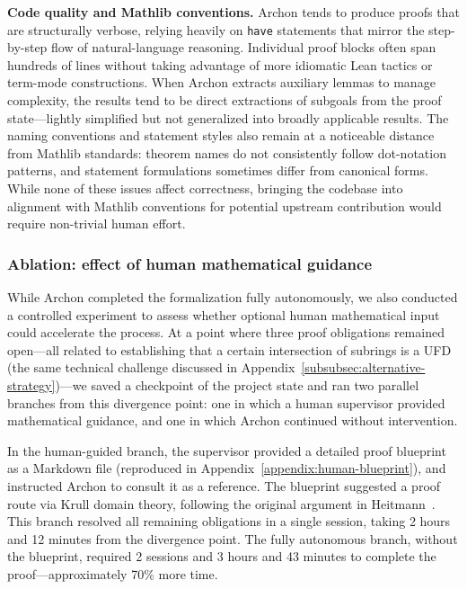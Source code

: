 \documentclass[]{pkuai4m}
\theoremstyle{plain}
\theoremstyle{definition}
\begin{document}
\textbf{Code quality and Mathlib conventions.} Archon tends to produce proofs that are structurally verbose, relying heavily on \texttt{have} statements that mirror the step-by-step flow of natural-language reasoning. Individual proof blocks often span hundreds of lines without taking advantage of more idiomatic Lean tactics or term-mode constructions. When Archon extracts auxiliary lemmas to manage complexity, the results tend to be direct extractions of subgoals from the proof state---lightly simplified but not generalized into broadly applicable results. The naming conventions and statement styles also remain at a noticeable distance from Mathlib standards: theorem names do not consistently follow dot-notation patterns, and statement formulations sometimes differ from canonical forms. While none of these issues affect correctness, bringing the codebase into alignment with Mathlib conventions for potential upstream contribution would require non-trivial human effort.

\subsubsection{Ablation: effect of human mathematical guidance\label{subsubsec:ablation-human}}

While Archon completed the formalization fully autonomously, we also conducted a controlled experiment to assess whether optional human mathematical input could accelerate the process. At a point where three proof obligations remained open---all related to establishing that a certain intersection of subrings is a UFD (the same technical challenge discussed in Appendix~\ref{subsubsec:alternative-strategy})---we saved a checkpoint of the project state and ran two parallel branches from this divergence point: one in which a human supervisor provided mathematical guidance, and one in which Archon continued without intervention.

In the human-guided branch, the supervisor provided a detailed proof blueprint as a Markdown file (reproduced in Appendix~\ref{appendix:human-blueprint}), and instructed Archon to consult it as a reference. The blueprint suggested a proof route via Krull domain theory, following the original argument in Heitmann~\cite{heitmann1993characterization}. This branch resolved all remaining obligations in a single session, taking 2 hours and 12 minutes from the divergence point. The fully autonomous branch, without the blueprint, required 2 sessions and 3 hours and 43 minutes to complete the proof---approximately 70\% more time.
\end{document}
